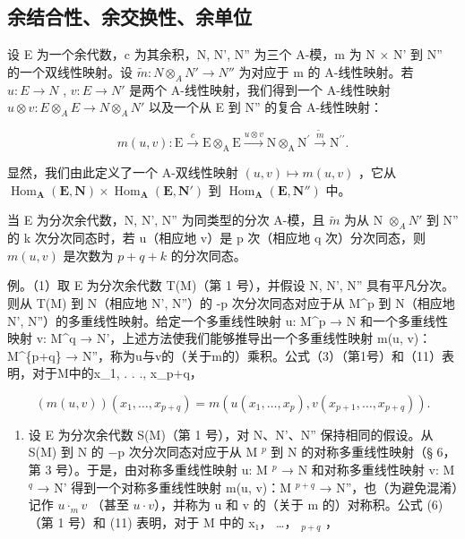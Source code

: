 \subsection{余结合性、余交换性、余单位}

设 E 为一个余代数，c 为其余积，N, N', N'' 为三个 A-模，m 为 N × N' 到 N'' 的一个双线性映射。设 \(\tilde{m}:N \otimes_{A} N' \to N''\) 为对应于 m 的 A-线性映射。若 \(u:E \to N\) , \(v:E \to N'\) 是两个 A-线性映射，我们得到一个 A-线性映射 \(u \otimes v:E \otimes_{A} E \to N \otimes_{A} N'\) 以及一个从 E 到 N'' 的复合 A-线性映射：

\[
m (u, v): \mathrm{E} \xrightarrow {c} \mathrm{E} \otimes_ {\mathrm{A}} \mathrm{E} \xrightarrow {u \otimes v} \mathrm{N} \otimes_ {\mathrm{A}} \mathrm{N} ^ {\prime} \xrightarrow {\tilde {m}} \mathrm{N} ^ {\prime \prime}.\tag{11}
\]

显然，我们由此定义了一个 A-双线性映射 \((u, v) \mapsto m(u, v)\) ，它从 \(\operatorname{Hom}_{\mathbf{A}}(\mathbf{E}, \mathbf{N}) \times \operatorname{Hom}_{\mathbf{A}}(\mathbf{E}, \mathbf{N}')\) 到 \(\operatorname{Hom}_{\mathbf{A}}(\mathbf{E}, \mathbf{N}'')\) 中。

当 E 为分次余代数，N, N', N'' 为同类型的分次 A-模，且 \(\tilde{m}\) 为从 N \(\otimes_{A}N'\) 到 N'' 的 k 次分次同态时，若 u（相应地 v）是 p 次（相应地 q 次）分次同态，则 \(m(u,v)\) 是次数为 \(p + q + k\) 的分次同态。

例。（1）取 E 为分次余代数 T(M)（第 1 号），并假设 N, N', N'' 具有平凡分次。则从 T(M) 到 N（相应地 N', N''）的 -p 次分次同态对应于从 M\^{}p 到 N（相应地 N', N''）的多重线性映射。给定一个多重线性映射 u: M\^{}p → N 和一个多重线性映射 v: M\^{}q → N'，上述方法使我们能够推导出一个多重线性映射 m(u, v)：M\^{}\{p+q\} → N''，称为u与v的（关于m的）乘积。公式（3）（第1号）和（11）表明，对于M中的x\_1, . . ., x\_p+q，

\[
(m (u, v)) \left(x _ {1}, \dots , x _ {p + q}\right) = m \left(u \left(x _ {1}, \dots , x _ {p}\right), v \left(x _ {p + 1}, \dots , x _ {p + q}\right)\right).
\]

\begin{enumerate}
\def\labelenumi{(\arabic{enumi})}
\setcounter{enumi}{1}
\tightlist
\item
  设 E 为分次余代数 S(M)（第 1 号），对 N、N'、N'' 保持相同的假设。从 S(M) 到 N 的 −p 次分次同态对应于从 M \(^{p}\) 到 N 的对称多重线性映射（§ 6，第 3 号）。于是，由对称多重线性映射 u: M \(^{p}\) → N 和对称多重线性映射 v: M \(^{q}\) → N' 得到一个对称多重线性映射 m(u, v)：M \(^{p+q}\) → N''，也（为避免混淆）记作 \(u \cdot_{m} v\) （甚至 \(u \cdot v\)），并称为 u 和 v 的（关于 m 的）对称积。公式 (6)（第 1 号）和 (11) 表明，对于 M 中的 x₁， \ldots， \(_{p+q}\) ，
\end{enumerate}

